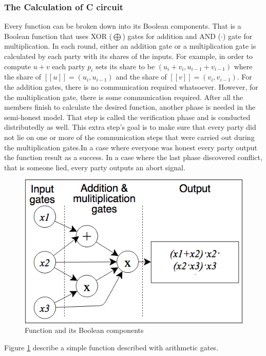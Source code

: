 \documentclass[12pt]{article}
\begin{document}
\subsubsection{The Calculation of C circuit}
Every function can be broken down into its Boolean components. That is a Boolean function that uses XOR ($\bigoplus$) gates for addition and AND ($\cdot$) gate for multiplication.\hfill\break
In each round, either an addition gate or a multiplication gate is calculated by each party with its shares of the inputs. For example, in order to compute $u+v$ each party $p_i$ sets its share to be $(u_i+v_i, u_{i-1}+v_{i-1})$ where the share of $[[u]] = (u_i, u_{i-1})$ and the share of $[[v]] = (v_i, v_{i-1})$.
For the addition gates, there is no communication required whatsoever. However, for the multiplication gate, there is some communication required. After all the members finish to calculate the desired function, another phase is needed in the semi-honest model. That step is called the verification phase and is conducted distributedly as well. This extra step’s goal is to make sure that every party did not lie on one or more of the communication steps that were carried out during the multiplication gates.In a case where everyone was honest every party output the function result as a success. In a case where the last phase discovered conflict, that is someone lied, every party outputs an abort signal.

\hfill\break
\begin{figure}[h!]
	\centering
	\includegraphics[width=0.45\linewidth]{"../Figures/ArithmiticCircuit"}
	\caption{Function and its Boolean components}
	\label{fig:arithmiticcircuit}
\end{figure}

\hfill\break
Figure \ref{fig:arithmiticcircuit} describe a simple function described with arithmetic gates.


\pagebreak
\end{document}
